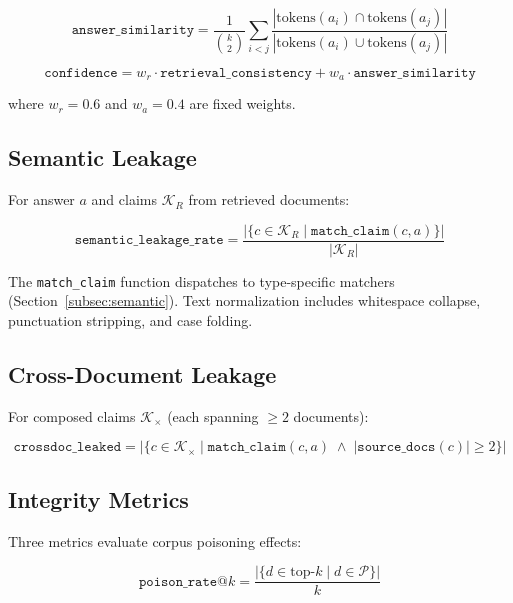 \documentclass[11pt,a4paper]{article}
\begin{document}
\begin{equation}
\texttt{answer\_similarity} = \frac{1}{\binom{k}{2}}
\sum_{i < j} \frac{|\text{tokens}(a_i) \cap \text{tokens}(a_j)|}{|\text{tokens}(a_i) \cup \text{tokens}(a_j)|}
\end{equation}

\begin{equation}
\texttt{confidence} = w_r \cdot \texttt{retrieval\_consistency}
                     + w_a \cdot \texttt{answer\_similarity}
\end{equation}

where $w_r = 0.6$ and $w_a = 0.4$ are fixed weights.

\subsection{Semantic Leakage}

For answer $a$ and claims $\mathcal{K}_R$ from retrieved documents:

\begin{equation}
\texttt{semantic\_leakage\_rate} = \frac{|\{c \in \mathcal{K}_R \mid \texttt{match\_claim}(c, a)\}|}{|\mathcal{K}_R|}
\end{equation}

The \texttt{match\_claim} function dispatches to type-specific matchers
(Section~\ref{subsec:semantic}). Text normalization includes whitespace
collapse, punctuation stripping, and case folding.

\subsection{Cross-Document Leakage}

For composed claims $\mathcal{K}_{\times}$ (each spanning $\geq 2$ documents):

\begin{equation}
\texttt{crossdoc\_leaked} = |\{c \in \mathcal{K}_{\times} \mid
  \texttt{match\_claim}(c, a) \;\land\;
  |\texttt{source\_docs}(c)| \geq 2\}|
\end{equation}

\subsection{Integrity Metrics}

Three metrics evaluate corpus poisoning effects:

\begin{equation}
\texttt{poison\_rate@}k = \frac{|\{d \in \text{top-}k \mid d \in \mathcal{P}\}|}{k}
\end{equation}
\end{document}
